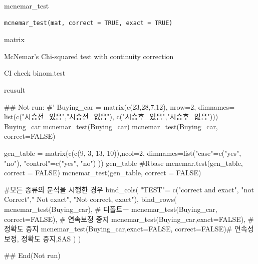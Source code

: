 \documentclass[a4paper]{book}
\begin{document}
%
\begin{Description}
mcnemar\_test
\end{Description}
%
\begin{Usage}
\begin{verbatim}
mcnemar_test(mat, correct = TRUE, exact = TRUE)
\end{verbatim}
\end{Usage}
%
\begin{Arguments}
\begin{ldescription}
\item[\code{mat}] matrix

\item[\code{correct}] McNemar's Chi-squared test with continuity correction

\item[\code{exact}] CI check binom.test
\end{ldescription}
\end{Arguments}
%
\begin{Value}
reusult
\end{Value}
%
\begin{Examples}
\begin{ExampleCode}

\#\# Not run: 
#'
Buying_car  = matrix(c(23,28,7,12), nrow=2,
                     dimnames= list(c("시승전_있음","시승전_없음"),
                                    c("시승후_있음","시승후_없음")))
Buying_car
mcnemar_test(Buying_car)
mcnemar_test(Buying_car, correct=FALSE)

gen_table = matrix(c(c(9, 3, 13, 10)),ncol=2,
                   dimnames=list("case"=c("yes", "no"),
                                 "control"=c("yes", "no")   ))
gen_table
#Rbase
mcnemar.test(gen_table, correct = FALSE)
mcnemar_test(gen_table, correct = FALSE)



#모든 종류의 분석을 시행한 경우
bind_cols(
  "TEST"= c("correct and exact", "not Correct"," Not exact", "Not correct, exact"),
  bind_rows(
    mcnemar_test(Buying_car),  # 디폴트ㅡ
    mcnemar_test(Buying_car, correct=FALSE), # 연속보정 중지
    mcnemar_test(Buying_car,exact=FALSE), # 정확도 중지
    mcnemar_test(Buying_car,exact=FALSE, correct=FALSE)# 연속성 보정, 정확도 중지,SAS
  )
)%

## End(Not run)
\end{ExampleCode}
\end{Examples}
\end{document}
